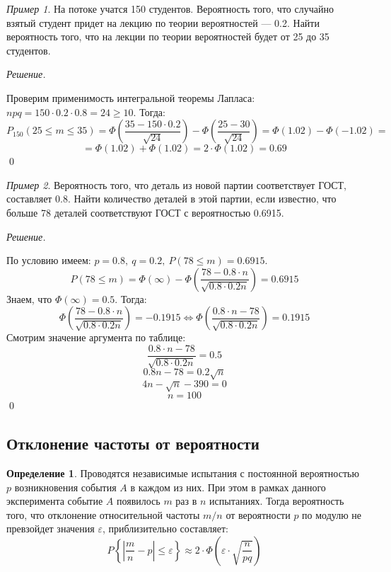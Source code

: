\documentclass[12pt,a4paper]{article}
\theoremstyle{definition}
\newtheorem{definition}{Определение}[section]
\theoremstyle{definition}
\theoremstyle{remark}
\theoremstyle{corollary}
\theoremstyle{bolditalic}
\newtheorem{example}{Пример}[section]
\newenvironment{solution}{
    \vspace{0.5em}
    \noindent\textit{Решение.}
}{\qed\vspace{1em}}
\begin{document}
\begin{example}
    На потоке учатся 150 студентов. Вероятность того, что случайно взятый студент придет на лекцию по теории вероятностей --- 0.2. Найти вероятность того, что на лекции по теории вероятностей будет от 25 до 35 студентов.
\end{example}

\begin{solution}
    Проверим применимость интегральной теоремы Лапласа: $npq=150\cdot 0.2\cdot 0.8=24 \ge 10$. Тогда:
    \[
    P_{150}(25 \le m \le 35) = \Phi\left( \frac{35-150\cdot 0.2}{\sqrt{24}}\right)- \Phi\left( \frac{25-30}{\sqrt{24}}\right)=\Phi(1.02)-\Phi(-1.02)=
    \]
    \[
    =\Phi(1.02)+\Phi(1.02)=2\cdot \Phi(1.02)=0.69
    \]
\end{solution}

\begin{example}
    Вероятность того, что деталь из новой партии соответствует ГОСТ, составляет 0.8. Найти количество деталей в этой партии, если известно, что больше 78 деталей соответствуют ГОСТ с вероятностью 0.6915.
\end{example}

\begin{solution}
    По условию имеем: $p=0.8,\ q=0.2,\ P(78 \le m)=0.6915$.
    \[
    P(78 \le m)=\Phi(\infty)-\Phi\left(\frac{78-0.8\cdot n}{\sqrt{0.8\cdot 0.2n}}\right)=0.6915
    \]
    Знаем, что $\Phi(\infty)=0.5$. Тогда:
    \[
    \Phi\left(\frac{78-0.8\cdot n}{\sqrt{0.8\cdot 0.2n}}\right)=-0.1915 \iff \Phi\left(\frac{0.8\cdot n -78}{\sqrt{0.8\cdot 0.2n}}\right)=0.1915
    \]
    Смотрим значение аргумента по таблице:
    \[
    \frac{0.8\cdot n -78}{\sqrt{0.8\cdot 0.2n}}=0.5
    \]
    \[
    0.8n-78=0.2\sqrt{n}
    \]
    \[
    4n-\sqrt{n}-390=0
    \]
    \[
    n=100
    \]
\end{solution}

\subsection{Отклонение частоты от вероятности}

\begin{definition}
    Проводятся независимые испытания с постоянной вероятностью $p$ возникновения события $A$ в каждом из них. При этом в рамках данного эксперимента событие $A$ появилось $m$ раз в $n$ испытаниях. Тогда вероятность того, что отклонение относительной частоты $m/n$ от вероятности $p$ по модулю не превзойдет значения $\varepsilon$, приблизительно составляет:
    \[
    P\left\{\left|\frac{m}{n} - p\right| \le \varepsilon \right\} \approx 2\cdot \Phi\left( \varepsilon \cdot \sqrt{\frac{n}{pq}}\right)
    \]
\end{definition}
\end{document}

